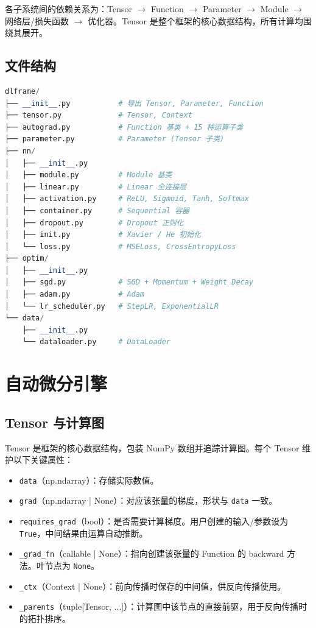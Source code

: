 \documentclass[12pt,a4paper]{ctexart}
\begin{document}
各子系统间的依赖关系为：Tensor $\rightarrow$ Function $\rightarrow$ Parameter $\rightarrow$ Module $\rightarrow$ 网络层/损失函数 $\rightarrow$ 优化器。Tensor 是整个框架的核心数据结构，所有计算均围绕其展开。

\subsection{文件结构}

\begin{lstlisting}[language=Python, caption={框架文件结构}]
dlframe/
├── __init__.py           # 导出 Tensor, Parameter, Function
├── tensor.py             # Tensor, Context
├── autograd.py           # Function 基类 + 15 种运算子类
├── parameter.py          # Parameter (Tensor 子类)
├── nn/
│   ├── __init__.py
│   ├── module.py         # Module 基类
│   ├── linear.py         # Linear 全连接层
│   ├── activation.py     # ReLU, Sigmoid, Tanh, Softmax
│   ├── container.py      # Sequential 容器
│   ├── dropout.py        # Dropout 正则化
│   ├── init.py           # Xavier / He 初始化
│   └── loss.py           # MSELoss, CrossEntropyLoss
├── optim/
│   ├── __init__.py
│   ├── sgd.py            # SGD + Momentum + Weight Decay
│   ├── adam.py           # Adam
│   └── lr_scheduler.py   # StepLR, ExponentialLR
└── data/
    ├── __init__.py
    └── dataloader.py     # DataLoader
\end{lstlisting}

\section{自动微分引擎}

\subsection{Tensor 与计算图}

Tensor 是框架的核心数据结构，包装 NumPy 数组并追踪计算图。每个 Tensor 维护以下关键属性：

\begin{itemize}
    \item \texttt{data}（np.ndarray）：存储实际数值。
    \item \texttt{grad}（np.ndarray | None）：对应该张量的梯度，形状与 \texttt{data} 一致。
    \item \texttt{requires\_grad}（bool）：是否需要计算梯度。用户创建的输入/参数设为 \texttt{True}，中间结果由运算自动推断。
    \item \texttt{\_grad\_fn}（callable | None）：指向创建该张量的 Function 的 backward 方法。叶节点为 \texttt{None}。
    \item \texttt{\_ctx}（Context | None）：前向传播时保存的中间值，供反向传播使用。
    \item \texttt{\_parents}（tuple[Tensor, ...]）：计算图中该节点的直接前驱，用于反向传播时的拓扑排序。
\end{itemize}
\end{document}
